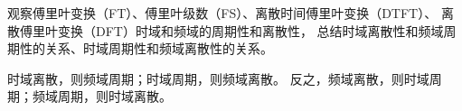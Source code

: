 \begin{homework}
    观察傅里叶变换（FT）、傅里叶级数（FS）、离散时间傅里叶变换（DTFT）、
    离散傅里叶变换（DFT）时域和频域的周期性和离散性，
    总结时域离散性和频域周期性的关系、时域周期性和频域离散性的关系。
\end{homework}

\begin{solution}
    时域离散，则频域周期；时域周期，则频域离散。
    反之，频域离散，则时域周期；频域周期，则时域离散。
\end{solution}
